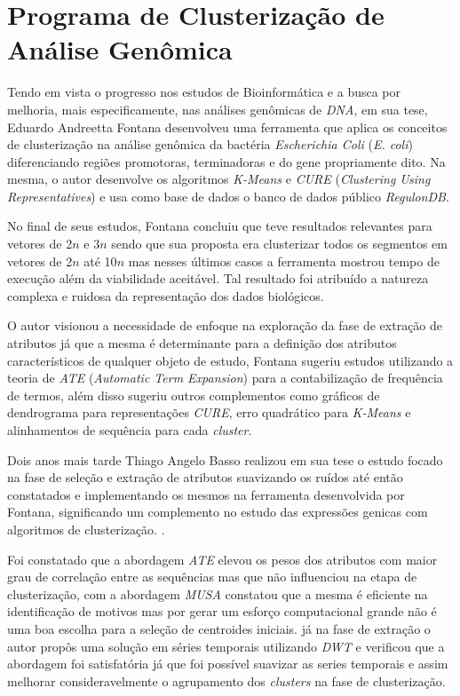 \chapter{Programa de Clusterização de Análise Genômica}
\label{cap:PROGRAMA}

Tendo em vista o progresso nos estudos de Bioinformática e a busca por melhoria, mais especificamente, nas análises genômicas de \textit{DNA}, em sua tese, Eduardo Andreetta Fontana desenvolveu uma ferramenta que aplica os conceitos de clusterização na análise genômica da bactéria \textit{Escherichia Coli} (\textit{E. coli}) diferenciando regiões promotoras, terminadoras e do gene propriamente dito. Na mesma, o autor desenvolve os algoritmos \textit{K-Means} e \textit{CURE} (\textit{Clustering Using Representatives}) e usa como base de dados o banco de dados público \textit{RegulonDB}\cite{Fontana:2013:UCS}.

No final de seus estudos, Fontana concluiu que teve resultados relevantes para vetores de 2\(\mathit{n}\) e 3\(\mathit{n}\) sendo que sua proposta era clusterizar todos os segmentos em vetores de 2\(\mathit{n}\) até 10\(\mathit{n}\) mas nesses últimos casos a ferramenta mostrou tempo de execução além da viabilidade aceitável. Tal resultado foi atribuído a natureza complexa e ruidosa da representação dos dados biológicos\cite{Fontana:2013:UCS}.

O autor visionou a necessidade de enfoque na exploração da fase de extração de atributos já que a mesma é determinante para a definição dos atributos característicos de qualquer objeto de estudo, Fontana sugeriu estudos utilizando a teoria de \textit{ATE} (\textit{Automatic Term Expansion}) \cite{Ji:2008} para a contabilização de frequência de termos, além disso sugeriu outros complementos como gráficos de dendrograma para representações \textit{CURE}, erro quadrático para \textit{K-Means} e alinhamentos de sequência para cada \textit{cluster}\cite{Fontana:2013:UCS}.

Dois anos mais tarde Thiago Angelo Basso realizou em sua tese o estudo focado na fase de seleção e extração de atributos suavizando os ruídos até então constatados e implementando os mesmos na ferramenta desenvolvida por Fontana, significando um complemento no estudo das expressões genicas com algoritmos de clusterização. \cite{Basso:2015:UCS}.

Foi constatado que a abordagem \textit{ATE} elevou os pesos dos atributos com maior grau de correlação entre as sequências mas que não influenciou na etapa de clusterização, com a abordagem \textit{MUSA}\cite{Mendes2006} constatou que a mesma é eficiente na identificação de motivos mas por gerar um esforço computacional grande não é uma boa escolha para a seleção de centroides iniciais. já na fase de extração o autor propôs uma solução em séries temporais utilizando \textit{DWT}\cite{Batal2009} e verificou que a abordagem foi satisfatória já que foi possível suavizar as series temporais e assim melhorar consideravelmente o agrupamento dos \textit{clusters} na fase de clusterização\cite{Basso:2015:UCS}.

